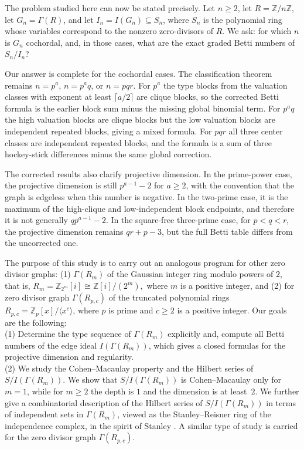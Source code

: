\documentclass[12pt]{article}
\theoremstyle{definition}
\begin{document}
\medskip

The problem studied here can now be stated precisely.  Let $n\geq 2$, let $R=\mathbb{Z}/n\mathbb{Z}$, let $G_n=\Gamma(R)$, and let $I_n=I(G_n)\subseteq S_n$, where $S_n$ is the polynomial ring whose variables correspond to the nonzero zero-divisors of $R$.  We ask: for which $n$ is $G_n$ cochordal, and, in those cases, what are the exact graded Betti numbers of $S_n/I_n$?

\medskip

Our answer is complete for the cochordal cases.  The classification theorem remains $n=p^a$, $n=p^a q$, or $n=pqr$.  For $p^a$ the type blocks from the valuation classes with exponent at least $\lceil a/2\rceil$ are clique blocks, so the corrected Betti formula is the earlier block sum minus the missing global binomial term.  For $p^a q$ the high valuation blocks are clique blocks but the low valuation blocks are independent repeated blocks, giving a mixed formula.  For $pqr$ all three center classes are independent repeated blocks, and the formula is a sum of three hockey-stick differences minus the same global correction.

\medskip

The corrected results also clarify projective dimension.  In the prime-power case, the projective dimension is still $p^{a-1}-2$ for $a\geq 2$, with the convention that the graph is edgeless when this number is negative.  In the two-prime case, it is the maximum of the high-clique and low-independent block endpoints, and therefore it is not generally $q p^{a-1}-2$.  In the square-free three-prime case, for $p<q<r$, the projective dimension remains $qr+p-3$, but the full Betti table differs from the uncorrected one.

\medskip

The purpose of this study is to carry out an analogous program for other zero divisor graphs: (1) $\Gamma(R_m)$ of the	Gaussian integer ring modulo powers of $2$, that is, $R_m = \mathbb Z_{2^{m}}[i] \cong \mathbb Z[i]/(2^{m}),$	where $m$ is a positive integer, and (2) for zero divisor graph $\Gamma(R_{p,c}) $ of the truncated polynomial rings 	$R_{p,c}=\mathbb Z_p[x]/\langle x^c\rangle$, where $p$ is prime and $c\ge2$ is a positive integer. Our goals are the following:\\
(1)  Determine the type sequence of $\Gamma(R_m)$ explicitly and, compute
all Betti numbers of the edge ideal $I(\Gamma(R_m))$, which gives a closed
formulas for the projective dimension and regularity. \\
(2) We study the Cohen--Macaulay property	and the Hilbert series of $S/I(\Gamma(R_m))$.  We show that $S/I(\Gamma(R_m))$
is Cohen--Macaulay only for $m=1$, while for $m\ge2$ the depth is $1$ and the
dimension is at least~$2$.  We further give a combinatorial description of
the Hilbert series of $S/I(\Gamma(R_m))$ in terms of independent sets in
$\Gamma(R_m)$, viewed as the Stanley–Reisner ring of the independence
complex, in the spirit of Stanley \cite{Stanley1996}. A similar type of study is carried for the zero divisor graph $\Gamma(R_{p,c})$.\medskip
\end{document}
